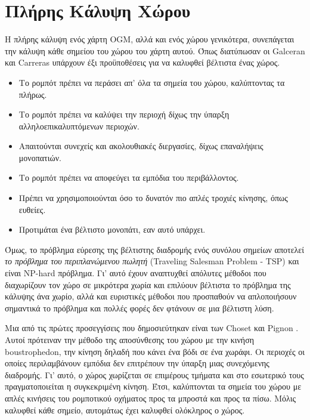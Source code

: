 \section{Πλήρης Κάλυψη Χώρου}
\label{section:full_coverage}

Η πλήρης κάλυψη ενός χάρτη OGM, αλλά και ενός χώρου γενικότερα, συνεπάγεται την κάλυψη κάθε σημείου του χώρου του χάρτη αυτού. Όπως διατύπωσαν οι Galceran και Carreras \cite{Galceran2013ASO} υπάρχουν έξι προϋποθέσεις για να καλυφθεί βέλτιστα ένας χώρος.
\begin{itemize}
    \setlength\itemsep{-0.2em}
    \item Το ρομπότ πρέπει να περάσει απ' όλα τα σημεία του χώρου, καλύπτοντας τα πλήρως.
    \item Το ρομπότ πρέπει να καλύψει την περιοχή δίχως την ύπαρξη αλληλοεπικαλυπτόμενων περιοχών.
    \item Απαιτούνται συνεχείς και ακολουθιακές διεργασίες, δίχως επαναλήψεις μονοπατιών.
    \item Το ρομπότ πρέπει να αποφεύγει τα εμπόδια του περιβάλλοντος.
    \item Πρέπει να χρησιμοποιούνται όσο το δυνατόν πιο απλές τροχιές κίνησης, όπως ευθείες.
    \item Προτιμάται ένα βέλτιστο μονοπάτι, εαν αυτό υπάρχει.
\end{itemize}

Όμως, το πρόβλημα εύρεσης της βέλτιστης διαδρομής ενός συνόλου σημείων αποτελεί \emph{το πρόβλημα του περιπλανώμενου πωλητή} (Traveling Salesman Problem - TSP) και είναι NP-hard πρόβλημα. Γι' αυτό έχουν αναπτυχθεί απόλυτες μέθοδοι που διαχωρίζουν τον χώρο σε μικρότερα χωρία και επιλύουν βέλτιστα το πρόβλημα της κάλυψης άνα χωρίο, αλλά και ευριστικές μέθοδοι που προσπαθούν να απλοποιήσουν σημαντικά το πρόβλημα και πολλές φορές δεν φτάνουν σε μια βέλτιστη λύση.

Μια από τις πρώτες προσεγγίσεις που δημοσιεύτηκαν είναι των Choset και Pignon \cite{Choset1998}. Αυτοί πρότειναν την μέθοδο της αποσύνθεσης του χώρου με την κινήση boustrophedon, την κίνηση δηλαδή που κάνει ένα βόδι σε ένα χωράφι. Οι περιοχές οι οποίες περιλαμβάνουν εμπόδια δεν επιτρέπουν την ύπαρξη μιας συνεχόμενης διαδρομής. Γι' αυτό, ο χώρος χωρίζεται σε επιμέρους τμήματα και στο εσωτερικό τους πραγματοποιείται η συγκεκριμένη κίνηση. Έτσι, καλύπτονται τα σημεία του χώρου με απλές κινήσεις του ρομποτικού οχήματος προς τα μπροστά και προς τα πίσω. Μόλις καλυφθεί κάθε σημείο, αυτομάτως έχει καλυφθεί ολόκληρος ο χώρος.

